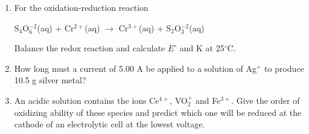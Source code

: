 \documentclass[../chem.tex]{subfiles}
\begin{document}
\begin{enumerate}
    \item For the oxidation-reduction reaction 
    \begin{center}
        S$_4$O$_6^{-2}$(aq) + Cr$^{2+}$(aq) $\rightarrow$ Cr$^{3+}$(aq) + S$_2$O$_3^{-2}$(aq)
    \end{center}
    Balance the redox reaction and calculate $E^{\circ}$ and K at 25$^{\circ}$C.
    \item How long must a current of 5.00 A be applied to a solution of Ag$^+$ to produce 10.5 g silver metal?
    \item An acidic solution contains the ions Ce$^{4+}$, VO$_2^+$ and Fe$^{3+}$. Give the order of oxidizing ability of these species and predict which one will be reduced at the cathode of an electrolytic cell at the lowest voltage.
\end{enumerate}
\end{document}
